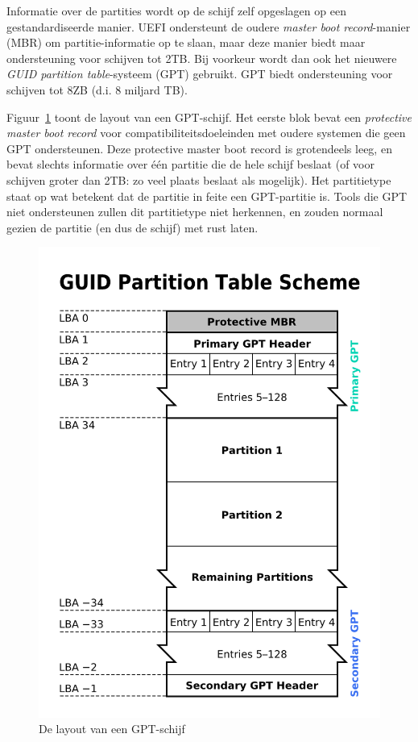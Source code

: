 Informatie over de partities wordt op de schijf zelf opgeslagen op een gestandardiseerde manier. UEFI ondersteunt de oudere \emph{master boot record}-manier (MBR) om partitie-informatie op te slaan, maar deze manier biedt maar ondersteuning voor schijven tot 2TB. Bij voorkeur wordt dan ook het nieuwere \emph{GUID partition table}-systeem (GPT) gebruikt. GPT biedt ondersteuning voor schijven tot 8ZB (d.i. 8 miljard TB).

Figuur~\ref{fig:gpt-layout} toont de layout van een GPT-schijf. Het eerste blok bevat een \emph{protective master boot record} voor compatibiliteitsdoeleinden met oudere systemen die geen GPT ondersteunen. Deze protective master boot record is grotendeels leeg, en bevat slechts informatie over \'e\'en partitie die de hele schijf beslaat (of voor schijven groter dan 2TB: zo veel plaats beslaat als mogelijk). Het partitietype staat op  wat betekent dat de partitie in feite een GPT-partitie is. Tools die GPT niet ondersteunen zullen dit partitietype niet herkennen, en zouden normaal gezien de partitie (en dus de schijf) met rust laten.

\begin{figure}
\centering
\includegraphics[scale=1]{images/gpt-layout.png}
\caption{De layout van een GPT-schijf}\label{fig:gpt-layout}
\end{figure}

